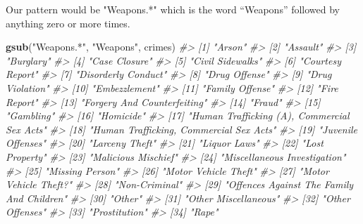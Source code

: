 \documentclass[
  12pt,
]{book}
\newenvironment{Shaded}{\begin{snugshade}}{\end{snugshade}}
\newcommand{\CommentTok}[1]{\textcolor[rgb]{0.37,0.37,0.37}{\textit{#1}}}
\newcommand{\KeywordTok}[1]{\textcolor[rgb]{0.27,0.27,0.27}{\textbf{#1}}}
\newcommand{\NormalTok}[1]{#1}
\newcommand{\StringTok}[1]{\textcolor[rgb]{0.5,0.5,0.5}{#1}}
\begin{document}
Our pattern would be "Weapons.*" which is the word ``Weapons'' followed by anything zero or more times.

\begin{Shaded}
\begin{Highlighting}[]
\KeywordTok{gsub}\NormalTok{(}\StringTok{"Weapons.*"}\NormalTok{, }\StringTok{"Weapons"}\NormalTok{, crimes)}
\CommentTok{\#>  [1] "Arson"                                     }
\CommentTok{\#>  [2] "Assault"                                   }
\CommentTok{\#>  [3] "Burglary"                                  }
\CommentTok{\#>  [4] "Case Closure"                              }
\CommentTok{\#>  [5] "Civil Sidewalks"                           }
\CommentTok{\#>  [6] "Courtesy Report"                           }
\CommentTok{\#>  [7] "Disorderly Conduct"                        }
\CommentTok{\#>  [8] "Drug Offense"                              }
\CommentTok{\#>  [9] "Drug Violation"                            }
\CommentTok{\#> [10] "Embezzlement"                              }
\CommentTok{\#> [11] "Family Offense"                            }
\CommentTok{\#> [12] "Fire Report"                               }
\CommentTok{\#> [13] "Forgery And Counterfeiting"                }
\CommentTok{\#> [14] "Fraud"                                     }
\CommentTok{\#> [15] "Gambling"                                  }
\CommentTok{\#> [16] "Homicide"                                  }
\CommentTok{\#> [17] "Human Trafficking (A), Commercial Sex Acts"}
\CommentTok{\#> [18] "Human Trafficking, Commercial Sex Acts"    }
\CommentTok{\#> [19] "Juvenile Offenses"                         }
\CommentTok{\#> [20] "Larceny Theft"                             }
\CommentTok{\#> [21] "Liquor Laws"                               }
\CommentTok{\#> [22] "Lost Property"                             }
\CommentTok{\#> [23] "Malicious Mischief"                        }
\CommentTok{\#> [24] "Miscellaneous Investigation"               }
\CommentTok{\#> [25] "Missing Person"                            }
\CommentTok{\#> [26] "Motor Vehicle Theft"                       }
\CommentTok{\#> [27] "Motor Vehicle Theft?"                      }
\CommentTok{\#> [28] "Non{-}Criminal"                              }
\CommentTok{\#> [29] "Offences Against The Family And Children"  }
\CommentTok{\#> [30] "Other"                                     }
\CommentTok{\#> [31] "Other Miscellaneous"                       }
\CommentTok{\#> [32] "Other Offenses"                            }
\CommentTok{\#> [33] "Prostitution"                              }
\CommentTok{\#> [34] "Rape"                                      }

\end{Highlighting}
\end{Shaded}
\end{document}
